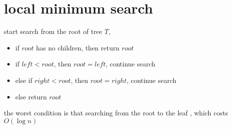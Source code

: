 \section{local minimum search}

start search from the root of tree $T$, 
\begin{itemize}
	\item if $root$ has no children, then return $root$
	\item if $left < root$, then $root = left$, continue search
	\item else if $right < root$, then $root = right$, continue search
	\item else return $root$
\end{itemize}

the worst condition is that searching from the root to the leaf , 
which costs $O(\log n)$
